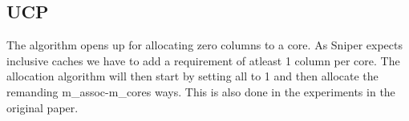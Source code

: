 
\subsection{UCP}
\label{sec:background:algorithms:ucp}

The algorithm opens up for allocating zero columns to a core. 
As Sniper expects inclusive caches we have to add a requirement of atleast 1 column per core. 
The allocation algorithm will then start by setting all to 1 and then allocate the remanding m\_assoc-m\_cores ways.
This is also done in the experiments in the original paper.
